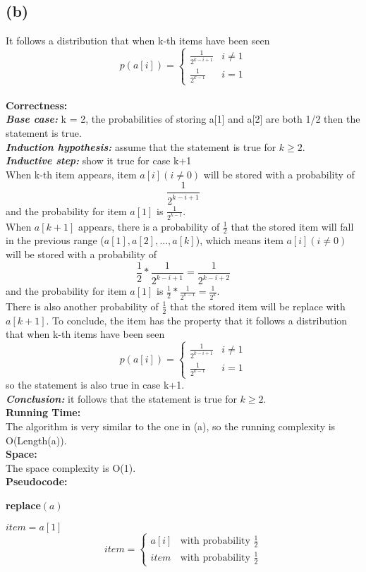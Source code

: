 \documentclass[twoside]{homework}
\begin{document}
\subsection*{(b)}
It follows a distribution that when k-th items have been seen $$p(a[i])= \begin{cases}
\frac{1}{2^{k-i+1}} & \text{$i\neq 1$}\\
\frac{1}{2^{k-1}} & \text{$i=1$}
\end{cases}$$
\\\textbf{Correctness:} \quad
\\\textbf{\emph{Base case:}}  k = 2, the probabilities of storing a[1] and a[2] are both 1/2 then the statement is true.
\\\textbf{\emph{Induction hypothesis:}} assume that the statement is true for $k\ge 2$.
\\\textbf{\emph{Inductive step:}} show it true for case k+1
\\When k-th item appears, item $a[i] (i\neq 0)$ will be stored with a probability of $$\frac{1}{2^{k-i+1}} $$
and the probability for item $a[1]$ is $\frac{1}{2^{k-1}} $.
\\When $a[k+1]$ appears, there is a probability of $\frac{1}{2}$ that the stored item will fall in the previous range ($a[1],a[2],...,a[k]$), which means item $a[i] (i\neq 0)$ will be stored with a probability of $$\frac{1}{2}*\frac{1}{2^{k-i+1}}=\frac{1}{2^{k-i+2}}$$
and the probability for item $a[1]$ is $\frac{1}{2}*\frac{1}{2^{k-1}}=\frac{1}{2^{k}} $.
\\There is also another probability of $\frac{1}{2}$ that the stored item will be replace with $a[k+1]$. To conclude, the item has the property that it follows a distribution that when k-th items have been seen $$p(a[i])= \begin{cases}
\frac{1}{2^{k-i+1}} & \text{$i\neq 1$}\\
\frac{1}{2^{k-1}} & \text{$i=1$}
\end{cases}$$ 
so the statement is also true in case k+1.
\\\textbf{\emph{Conclusion:}} 
it follows that the statement is true for $k\ge 2$.
\\\textbf{Running Time:} \quad
\\The algorithm is very similar to the one in (a), so the running complexity is O(Length(a)).
\\\textbf{Space:} \quad
\\The space complexity is O(1).
\\\textbf{Pseudocode:} \quad
\begin{algorithm}
	\caption*{\textbf{replace$(a)$}}
	\begin{algorithmic}
		\STATE $item=a[1]$
		\STATE $$item= \begin{cases}
		a[i] & \text{with probability $\frac{1}{2}$}\\
		item & \text{with probability $\frac{1}{2}$}
		\end{cases}$$
		\ENDFOR
	\end{algorithmic}		
\end{algorithm}
\end{document}

